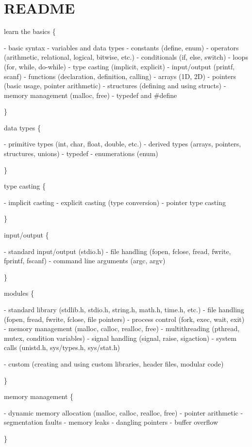 \chapter{README}
\hypertarget{md__2home_2antonio_2Development_2C_2README}{}\label{md__2home_2antonio_2Development_2C_2README}
learn the basics \{ \begin{DoxyVerb}- basic syntax
- variables and data types
- constants (define, enum)
- operators (arithmetic, relational, logical, bitwise, etc.)
- conditionals (if, else, switch)
- loops (for, while, do-while)
- type casting (implicit, explicit)
- input/output (printf, scanf)
- functions (declaration, definition, calling)
- arrays (1D, 2D)
- pointers (basic usage, pointer arithmetic)
- structures (defining and using structs)
- memory management (malloc, free)
- typedef and #define
\end{DoxyVerb}
 \}

data types \{ \begin{DoxyVerb}- primitive types (int, char, float, double, etc.)
- derived types (arrays, pointers, structures, unions)
- typedef
- enumerations (enum)
\end{DoxyVerb}
 \}

type casting \{ \begin{DoxyVerb}- implicit casting
- explicit casting (type conversion)
- pointer type casting
\end{DoxyVerb}
 \}

input/output \{ \begin{DoxyVerb}- standard input/output (stdio.h)
- file handling (fopen, fclose, fread, fwrite, fprintf, fscanf)
- command line arguments (argc, argv)
\end{DoxyVerb}
 \}

modules \{ \begin{DoxyVerb}- standard library (stdlib.h, stdio.h, string.h, math.h, time.h, etc.)
- file handling (fopen, fread, fwrite, fclose, file pointers)
- process control (fork, exec, wait, exit)
- memory management (malloc, calloc, realloc, free)
- multithreading (pthread, mutex, condition variables)
- signal handling (signal, raise, sigaction)
- system calls (unistd.h, sys/types.h, sys/stat.h)

- custom (creating and using custom libraries, header files, modular code)
\end{DoxyVerb}
 \}

memory management \{ \begin{DoxyVerb}- dynamic memory allocation (malloc, calloc, realloc, free)
- pointer arithmetic
- segmentation faults
- memory leaks
- dangling pointers
- buffer overflow
\end{DoxyVerb}
 \}

